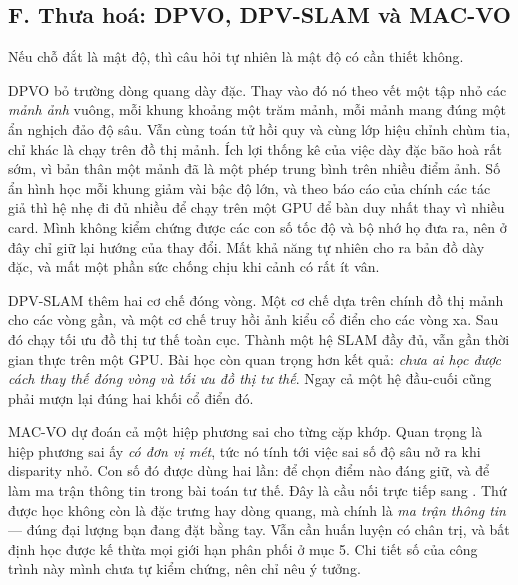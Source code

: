 \documentclass[../../deep_learning.tex]{subfiles}
\begin{document}

\subsection{F. Thưa hoá: DPVO, DPV-SLAM và MAC-VO}
Nếu chỗ đắt là mật độ, thì câu hỏi tự nhiên là mật độ có cần thiết không.

\begin{mach}
\item {}
\gp DPVO \cite{teed2023dpvo} bỏ trường dòng quang dày đặc. Thay vào đó nó theo vết một tập nhỏ các \emph{mảnh ảnh} vuông, mỗi khung khoảng một trăm mảnh, mỗi mảnh mang đúng một ẩn nghịch đảo độ sâu. Vẫn cùng toán tử hồi quy và cùng lớp hiệu chỉnh chùm tia, chỉ khác là chạy trên đồ thị mảnh.
\gd Ích lợi thống kê của việc dày đặc bão hoà rất sớm, vì bản thân một mảnh đã là một phép trung bình trên nhiều điểm ảnh.
\hq Số ẩn hình học mỗi khung giảm vài bậc độ lớn, và theo báo cáo của chính các tác giả thì hệ nhẹ đi đủ nhiều để chạy trên một GPU để bàn duy nhất thay vì nhiều card. Mình không kiểm chứng được các con số tốc độ và bộ nhớ họ đưa ra, nên ở đây chỉ giữ lại hướng của thay đổi.
\gia Mất khả năng tự nhiên cho ra bản đồ dày đặc, và mất một phần sức chống chịu khi cảnh có rất ít vân.

\item {}
\gp DPV-SLAM \cite{lipson2024dpvslam} thêm hai cơ chế đóng vòng. Một cơ chế dựa trên chính đồ thị mảnh cho các vòng gần, và một cơ chế truy hồi ảnh kiểu cổ điển cho các vòng xa. Sau đó chạy tối ưu đồ thị tư thế toàn cục.
\hq Thành một hệ SLAM đầy đủ, vẫn gần thời gian thực trên một GPU.
\gd Bài học còn quan trọng hơn kết quả: \emph{chưa ai học được cách thay thế đóng vòng và tối ưu đồ thị tư thế}. Ngay cả một hệ đầu-cuối cũng phải mượn lại đúng hai khối cổ điển đó.

\item {}
\gp MAC-VO \cite{qiu2025macvo} dự đoán cả một hiệp phương sai cho từng cặp khớp. Quan trọng là hiệp phương sai ấy \emph{có đơn vị mét}, tức nó tính tới việc sai số độ sâu nở ra khi disparity nhỏ. Con số đó được dùng hai lần: để chọn điểm nào đáng giữ, và để làm ma trận thông tin trong bài toán tư thế.
\hq Đây là cầu nối trực tiếp sang . Thứ được học không còn là đặc trưng hay dòng quang, mà chính là \emph{ma trận thông tin} --- đúng đại lượng bạn đang đặt bằng tay.
\gia Vẫn cần huấn luyện có chân trị, và bất định học được kế thừa mọi giới hạn phân phối ở mục 5. Chi tiết số của công trình này mình chưa tự kiểm chứng, nên chỉ nêu ý tưởng.
\end{mach}
\end{document}
